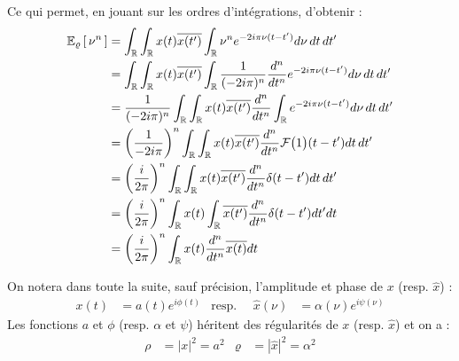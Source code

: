 \begin{proposition}
\begin{demo}
		Ce qui permet, en jouant sur les ordres d'intégrations, d'obtenir :
		\begin{align*}
			\esp[\varrho]{\nu^n} &= \int_\R \int_\R x(t) \congu{x(t')} \int_\R \nu^n e^{-2i \pi \nu (t-t')} d\nu\, dt\, dt' \\
			&= \int_\R \int_\R x(t) \congu{x(t')} \int_\R \frac{1}{(-2i \pi)^n}\frac{d^n}{dt^n}e^{-2i \pi \nu(t-t')} d\nu\, dt\, dt' \\
			&= \frac{1}{(-2i \pi)^n} \int_\R \int_\R x(t) \congu{x(t')} \frac{d^n}{dt^n}\int_\R e^{-2i \pi \nu(t-t')} d\nu\, dt\, dt' \\
			&= \left(\frac{1}{-2i \pi}\right)^n \int_\R \int_\R x(t) \congu{x(t')} \frac{d^n}{dt^n}\mathcal{F}\big(1\big)(t-t') dt\, dt' \\
			&= \left(\frac{i}{2 \pi}\right)^n \int_\R \int_\R x(t) \congu{x(t')} \frac{d^n}{dt^n}\delta(t-t') dt\, dt' \\
			&= \left(\frac{i}{2 \pi}\right)^n \int_\R x(t) \int_\R \congu{x(t')} \frac{d^n}{dt^n}\delta(t-t') dt' dt \\
			&= \left(\frac{i}{2 \pi}\right)^n  \int_\R x(t) \frac{d^n}{dt^n}  \congu{x(t)} dt
		\end{align*}
	\end{demo}
\end{proposition}

On notera dans toute la suite, sauf précision, l'amplitude et phase de $x$ (resp. $\hat{x}$) :
\begin{align*}
	x(t) &= a(t) e^{i\phi(t)}  &  \text{resp. }\quad \hat{x}(\nu) &= \alpha(\nu) e^{i\psi(\nu)}
\end{align*}
Les fonctions $a$ et $\phi$ (resp. $\alpha$ et $\psi$) héritent des régularités de $x$ (resp. $\hat{x}$) et on a :
\begin{align*}
	\rho &= |x|^2 = a^2  &  \varrho &= |\hat{x}|^2 = \alpha^2
\end{align*}
\\


